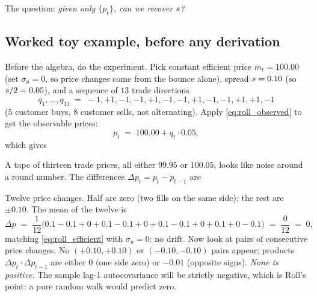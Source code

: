 The question: \emph{given only $\{p_t\}$, can we recover
$s$?}

\subsection{Worked toy example, before any derivation}
\label{subsec:roll_toy}

Before the algebra, do the experiment. Pick constant efficient
price $m_t = 100.00$ (set $\sigma_u = 0$, so price changes come
from the bounce alone), spread $s = 0.10$ (so $s/2 =
0.05$), and a sequence of $13$ trade directions
\[
  q_1, \ldots, q_{13}
  \;=\;
  -1, +1, -1, -1, +1, -1, -1, +1, -1, -1, +1, +1, -1
\]
($5$ customer buys, $8$ customer sells, not alternating). Apply
\cref{eq:roll_observed} to get the observable prices:
\[
  p_t \;=\; 100.00 + q_t \cdot 0.05,
\]
which gives
\begin{center}
\end{center}

A tape of thirteen trade prices, all either $99.95$ or $100.05$,
looks like noise around a round number. The differences
$\Delta p_t = p_t - p_{t-1}$ are
\begin{center}
\end{center}

Twelve price changes. Half are zero (two fills on the same side);
the rest are $\pm 0.10$. The mean of the twelve is
\[
  \overline{\Delta p}
  \;=\; \frac{1}{12} \bigl(0.1 - 0.1 + 0 + 0.1 - 0.1 + 0 + 0.1 - 0.1 + 0 + 0.1 + 0 - 0.1\bigr)
  \;=\; \frac{0}{12}
  \;=\; 0,
\]
matching \cref{eq:roll_efficient} with $\sigma_u = 0$: no drift.
Now look at pairs of consecutive price changes. No $(+0.10,
+0.10)$ or $(-0.10, -0.10)$ pairs appear; products $\Delta p_t
\cdot \Delta p_{t-1}$ are either $0$ (one side zero) or $-0.01$
(opposite signs). \emph{None is positive.} The sample lag-1
autocovariance will be strictly negative, which is Roll's point: a
pure random walk would predict zero.

